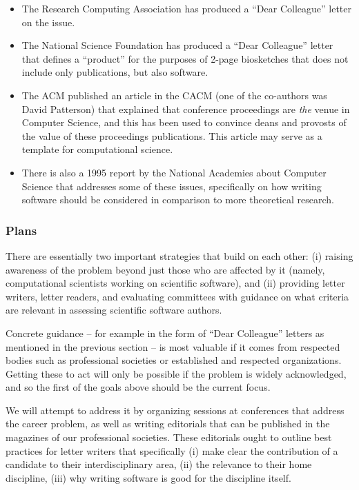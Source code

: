 \begin{itemize}
\item The Research Computing Association has produced a ``Dear Colleague'' letter on the issue.
\item The National Science Foundation has produced a ``Dear Colleague'' letter that defines a ``product'' for the purposes of 2-page biosketches that does not include only publications, but also software.
\item The ACM published an article in the CACM (one of the co-authors
  was David Patterson) that explained that conference proceedings are
  \textit{the} venue in Computer Science, and this has been used to
  convince deans and provosts of the value of these proceedings
  publications. This article may serve as a template for computational
  science.
\item There is also a 1995 report by the National Academies about
  Computer Science that addresses some of these issues, specifically
  on how writing software should be considered in comparison to more
  theoretical research.
\end{itemize}



\subsubsection{Plans}

There are essentially two important strategies that build on each
other: (i) raising awareness of the problem beyond just those who are
affected by it (namely, computational scientists working on scientific
software), and (ii) providing letter writers, letter readers, and
evaluating committees with guidance on what criteria are relevant in
assessing scientific software authors.

Concrete guidance -- for example in the form of ``Dear Colleague''
letters as mentioned in the previous section -- is most valuable if it
comes from respected bodies such as professional societies or
established and respected organizations. Getting these to act
will only be possible if the problem is widely acknowledged, and so
the first of the goals above should be the current focus.

We will attempt to address it by organizing sessions at conferences
that address the career problem, as well as writing editorials that
can be published in the magazines of our professional societies. These
editorials ought to outline best practices for letter writers that
specifically (i) make clear the contribution of a candidate to their
interdisciplinary area, (ii) the relevance to their home discipline,
(iii) why writing software is good for the discipline itself.


